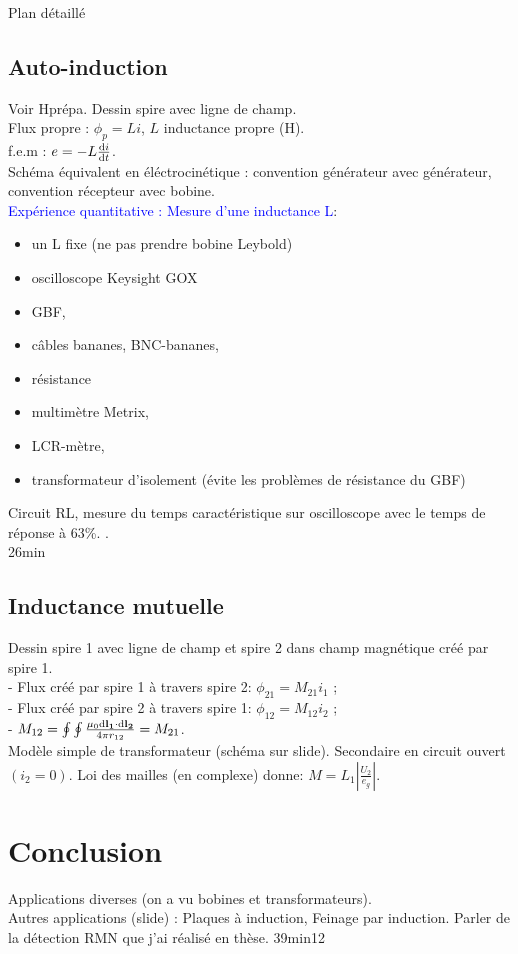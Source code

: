 \begin{reportBlock}{Plan détaillé}
\subsection{Auto-induction}
Voir Hprépa. Dessin spire avec ligne de champ. \\
Flux propre : $\phi_p = L i$, $L$ inductance propre (H). \\
f.e.m : $e = - L \frac{\mathrm{d} i}{\mathrm{d} t}$. \\
Schéma équivalent en éléctrocinétique : convention générateur avec générateur, convention récepteur avec bobine. \\

\textcolor{blue}{Expérience quantitative : Mesure d'une inductance L}: 
    \begin{itemize}
        \item un L fixe (ne pas prendre bobine Leybold)
        \item oscilloscope Keysight GOX
        \item GBF,
        \item câbles bananes, BNC-bananes,
        \item résistance
        \item multimètre Metrix,
        \item LCR-mètre,
        \item transformateur d'isolement (évite les problèmes de résistance du GBF)
    \end{itemize}
    Circuit RL, mesure du temps caractéristique sur oscilloscope avec le temps de réponse à 63\%. 
    .\\
    26min
    \subsection{Inductance mutuelle}
    Dessin spire 1 avec ligne de champ et spire 2 dans champ magnétique créé par spire 1. \\
    - Flux créé par spire 1 à travers spire 2: $\phi_{21} = M_{21} i_1$ ; \\
    - Flux créé par spire 2 à travers spire 1: $\phi_{12} = M_{12} i_2$ ; \\
    - $M_{12} = \oint \oint \frac{\mu_0 \mathrm{d} \mathbf{l_1} \cdot \mathrm{d} \mathbf{l_2}}{4 \pi r_{12}} = M_{21}$. \\
     Modèle simple de transformateur (schéma sur slide). Secondaire en circuit ouvert $(i_2 = 0)$. Loi des mailles (en complexe) donne: $ M = L_1 \left| \frac{U_2}{e_g} \right|$. 
     
\section*{Conclusion} 
Applications diverses (on a vu bobines et transformateurs). \\
Autres applications (slide) : Plaques à induction, Feinage par induction.\newline
Parler de la détection RMN que j'ai réalisé en thèse.
39min12
\end{reportBlock}


